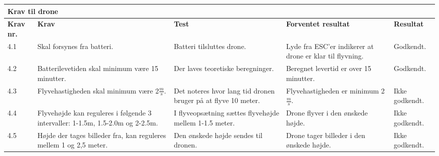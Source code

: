     \begin{tabular}{|p{}|p{3.2 cm}|p{3.2 cm}|p{3.2 cm}|p{2.2 cm}|}
			\hline
			\multicolumn{5}{|l|}{\textbf{{\large Krav til drone}}}\\ \hline
			\textbf{Krav nr.} & \textbf{Krav} & \textbf{Test} & \textbf{Forventet \newline resultat} & 			
			\textbf{Resultat} \\ \hline
			
			4.1 & Skal forsynes fra batteri.
				& Batteri tilsluttes drone.
				& Lyde fra ESC'er indikerer at drone er klar til flyvning.
				& Godkendt. \\ \hline

			4.2 & Batterilevetiden skal minimum være 15 minutter.
				& Der laves teoretiske beregninger.
				& Beregnet levertid er over 15 minutter.
				& Godkendt. \\ \hline
			
			4.3 & Flyvehastigheden skal minimum være 2$\frac{m}{s}$.
				& Det noteres hvor lang tid dronen bruger på at flyve 10 meter.
				& Flyvehastigheden er minimum 2$\frac{m}{s}$.
				& Ikke \newline godkendt.\\ \hline		
				
			4.4 & Flyvehøjde kan reguleres i følgende 3 intervaller: 1-1.5m, 1.5-2.0m og 2-2.5m.
				& I flyveopsætning sættes flyvehøjde mellem 1-1.5 meter.
				& Drone flyver i den ønskede højde.
				& Ikke \newline godkendt.\\ \hline	
				
			4.5 & Højde der tages billeder fra, kan reguleres mellem 1 og 2,5 meter.
				& Den ønskede højde sendes til dronen.
				& Drone tager billeder i den ønskede højde.
				& Ikke \newline godkendt.\\ \hline	
		\end{tabular}
	\label{tab:krav_1}

\vspace{1cm}
   
